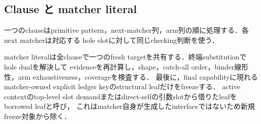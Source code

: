 \subsection{Clause と matcher literal}

一つのclauseはprimitive pattern，next-matcher列，arm列の順に処理する．各next matcherは対応する
hole slotに対して同じchecking判断を使う．
\begin{mathpar}
\end{mathpar}

matcher literalは全clauseで一つのfresh targetを共有する．終端substitutionでhole dualを解決して
evidenceを再計算し，shape，catch-all order，binder線形性，arm exhaustiveness，coverageを検査する．
最後に，final capabilityに現れるmatcher-owned explicit ledger keyのstructural leafだけをfreezeする．
active contextのtop-level slot demandまたはdirect-selfの引数slotから借りたleafをborrowed leafと呼び，
これはmatcher自身が生成したinterfaceではないため新規freeze対象から除く．
\begin{mathpar}
\end{mathpar}

